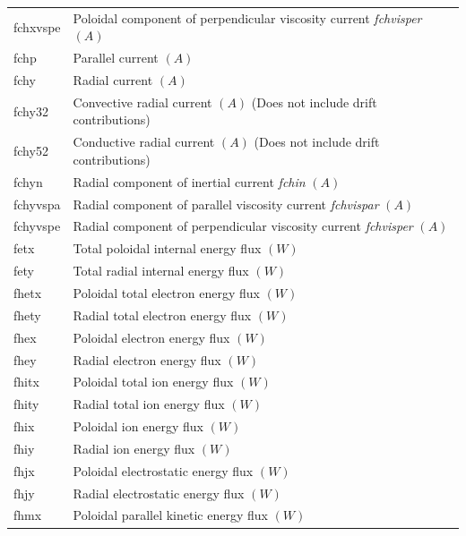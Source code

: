 \documentclass[a4paper,10pt]{report}
\begin{document}
\begin{center}
\begin{longtable}{|l|l|}
    fchxvspe & \index{b2plot, fchxvspe} Poloidal component of perpendicular viscosity current {\em fchvisper} $(A)$ \\
    fchp     & \index{b2plot, fchp} Parallel current $(A)$ \\
    fchy     & \index{b2plot, fchy} Radial current $(A)$ \\
    fchy32   & \index{b2plot, fchy32} Convective radial current $(A)$ (Does not include drift contributions) \\
    fchy52   & \index{b2plot, fchy52} Conductive radial current $(A)$ (Does not include drift contributions) \\
    fchyn    & \index{b2plot, fchyn} Radial component of inertial current {\em fchin} $(A)$ \\
    fchyvspa & \index{b2plot, fchyvspa} Radial component of parallel viscosity current {\em fchvispar} $(A)$ \\
    fchyvspe & \index{b2plot, fchyvspe} Radial component of perpendicular viscosity current {\em fchvisper} $(A)$ \\
    fetx     & \index{b2plot, fetx} Total poloidal internal energy flux $(W)$ \\
    fety     & \index{b2plot, fety} Total radial internal energy flux $(W)$ \\
    fhetx    & \index{b2plot, fhetx} Poloidal total electron energy flux $(W)$ \\
    fhety    & \index{b2plot, fhety} Radial total electron energy flux $(W)$ \\
    fhex     & \index{b2plot, fhex} Poloidal electron energy flux $(W)$ \\
    fhey     & \index{b2plot, fhey} Radial electron energy flux $(W)$ \\
    fhitx    & \index{b2plot, fhitx} Poloidal total ion energy flux $(W)$ \\
    fhity    & \index{b2plot, fhity} Radial total ion energy flux $(W)$ \\
    fhix     & \index{b2plot, fhix} Poloidal ion energy flux $(W)$ \\
    fhiy     & \index{b2plot, fhiy} Radial ion energy flux $(W)$ \\
    fhjx     & \index{b2plot, fhjx} Poloidal electrostatic energy flux $(W)$ \\
    fhjy     & \index{b2plot, fhjy} Radial electrostatic energy flux $(W)$ \\
    fhmx     & \index{b2plot, fhmx} Poloidal parallel kinetic energy flux $(W)$ \\

\end{longtable}
\end{center}
\end{document}

